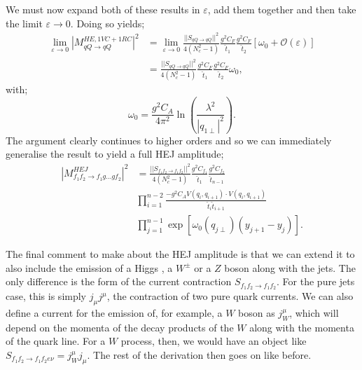 We must now expand both of these results in $\varepsilon$, add them together and then take the limit $\varepsilon \to 0$. Doing so yields;
\begin{equation}
\begin{split}
\lim_{\varepsilon \to 0} |M_{qQ \to qQ}^{HE, 1VC+1RC}|^2 &= \lim_{\varepsilon \to 0} \frac{||S_{qQ \to qQ}||^2}{4 (N_c^2 - 1)}\frac{g^2 C_{F}}{\hat{t}_1} \frac{g^2 C_{F}}{\hat{t}_2} \left[\omega_0 + \mathcal{O}(\varepsilon) \right] \\
&= \frac{||S_{qQ \to qQ}||^2}{4 (N_c^2 - 1)}\frac{g^2 C_{F}}{\hat{t}_1} \frac{g^2 C_{F}}{\hat{t}_2} \omega_0,
\end{split}
\end{equation}
with;
\begin{equation}
\omega_0 = \frac{g^2 C_A}{4 \pi^2} \ln \left( \frac{\lambda^2}{|q_{1 \perp}|^2}\right).
\end{equation}
The argument clearly continues to higher orders and so we can immediately generalise the result to yield a full HEJ amplitude; %
\begin{equation}
\begin{split}
|M_{f_1f_2 \to f_1g...gf_2}^{HEJ}|^2 &= \frac{||S_{f_1 f_2 \to f_1 f_2}||^2}{4 (N_c^2 - 1)}\frac{g^2 C_{f_1}}{\hat{t}_1} \frac{g^2 C_{f_2}}{\hat{t}_{n-1}} \\
& \prod_{i=1}^{n-2} \frac{-g^2 C_A V(q_{i}, q_{i+1}) \cdot V(q_{i}, q_{i+1})}{\hat{t}_{i} \hat{t}_{i+1}}  \\
& \prod_{j =1}^{n-1} \exp \left[ \omega_0(q_{j \perp})(y_{j+1} - y_j) \right].
\end{split}
\end{equation}

The final comment to make about the HEJ amplitude is that we can extend it to also include the emission of a Higgs \cite{Andersen2011a}, a $W^{\pm}$ \cite{Andersen2012} or a $Z$ boson \cite{Andersen2016} along with the jets. The only difference is the form of the current contraction $S_{f_1f_2 \to f_1 f_2}$. For the pure jets case, this is simply $j_\mu j^\mu$, the contraction of two pure quark currents. We can also define a current for the emission of, for example, a $W$ boson as $j^\mu_W$, which will depend on the momenta of the decay products of the $W$ along with the momenta of the quark line. For a $W$ process, then, we would have an object like $S_{f_1 f_2 \to f_1 f_2 e \nu} = j^\mu_W j_\mu$. The rest of the derivation then goes on like before. 

